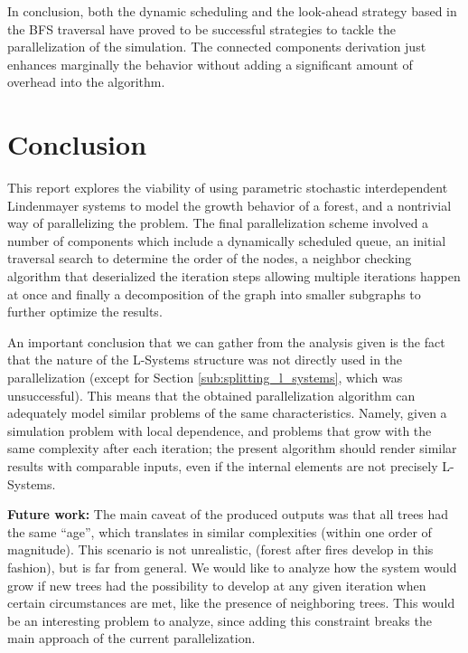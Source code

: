 \documentclass[letterpaper,twoside,11pt]{article}
\begin{document}
\begin{multicols}{2}
In conclusion, both the dynamic scheduling and the look-ahead strategy based in the BFS traversal have proved to be successful strategies to tackle the parallelization of the simulation. The connected components derivation just enhances marginally the behavior without adding a significant amount of overhead into the algorithm.



\section{Conclusion} %
\label{sec:conclusion}

This report explores the viability of using parametric stochastic interdependent Lindenmayer systems to model the growth behavior of a forest, and a nontrivial way of parallelizing the problem. The final parallelization scheme involved a number of components which include a dynamically scheduled queue, an initial traversal search to determine the order of the nodes, a neighbor checking algorithm that deserialized the iteration steps allowing multiple iterations happen at once and finally a decomposition of the graph into smaller subgraphs to further optimize the results.

An important conclusion that we can gather from the analysis given is the fact that the nature of the L-Systems structure was not directly used in the parallelization (except for Section \ref{sub:splitting_l_systems}, which was unsuccessful). This means that the obtained parallelization algorithm can adequately model similar problems of the same characteristics. Namely, given a simulation problem with local dependence, and problems that grow with the same complexity after each iteration; the present algorithm should render similar results with comparable inputs, even if the internal elements are not precisely L-Systems.

\textbf{Future work:} The main caveat of the produced outputs was that all trees had the same ``age'', which translates in similar complexities (within one order of magnitude). This scenario is not unrealistic, (forest after fires develop in this fashion), but is far from general. We would like to analyze how the system would grow if new trees had the possibility to develop at any given iteration when certain circumstances are met, like the presence of neighboring trees. This would be an interesting problem to analyze, since adding this constraint breaks the main approach of the current parallelization.


\end{multicols}
\end{document}
